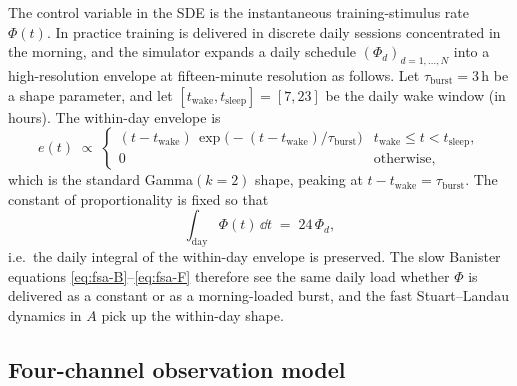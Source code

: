 The control variable in the SDE is the instantaneous training-stimulus
rate $\Phi(t)$. In practice training is delivered in discrete daily
sessions concentrated in the morning, and the simulator expands a daily
schedule $(\Phi_d)_{d=1,\dots,N}$ into a high-resolution envelope at
fifteen-minute resolution as follows. Let $\tau_{\mathrm{burst}}=3\,\mathrm{h}$ be a
shape parameter, and let $[t_{\mathrm{wake}},t_{\mathrm{sleep}}] = [7,23]$ be the
daily wake window (in hours). The within-day envelope is
\begin{equation}
  e(t) \;\propto\;
    \begin{cases}
      (t-t_{\mathrm{wake}})\,\exp\!\bigl(-(t-t_{\mathrm{wake}})/\tau_{\mathrm{burst}}\bigr)
        & t_{\mathrm{wake}} \le t < t_{\mathrm{sleep}}, \\
      0  & \text{otherwise},
    \end{cases}
  \label{eq:phi-envelope}
\end{equation}
which is the standard Gamma$(k=2)$ shape, peaking at
$t-t_{\mathrm{wake}} = \tau_{\mathrm{burst}}$. The constant of proportionality
is fixed so that
\begin{equation}
  \int_{\text{day}} \Phi(t)\,\dd t \;=\; 24\,\Phi_d,
\end{equation}
i.e.~the daily integral of the within-day envelope is preserved. The slow
Banister equations \eqref{eq:fsa-B}--\eqref{eq:fsa-F} therefore see the
same daily load whether $\Phi$ is delivered as a constant or as a
morning-loaded burst, and the fast Stuart--Landau dynamics in $A$ pick up
the within-day shape.

\subsection{Four-channel observation model}

